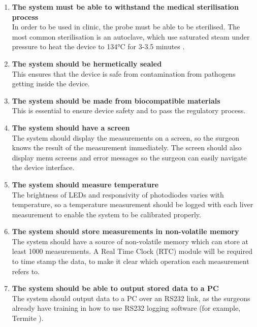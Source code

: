 \begin{enumerate}
\item \label{req: sterilise} \textbf{The system must be able to withstand the medical sterilisation process}\\
In order to be used in clinic, the probe must be able to be sterilised. The most common sterilisation is an autoclave, which use saturated steam under pressure to heat the device to 134\si{\celsius} for 3-3.5 minutes \cite{nhs_autoclave}.

\item \label{req: seal} \textbf{The system should be hermetically sealed}\\
This ensures that the device is safe from contamination from pathogens getting inside the device.

\item \label{req: biocompatible} \textbf{The system should be made from biocompatible materials}\\
This is essential to ensure device safety and to pass the regulatory process.




\item \label{req: screen} \textbf{The system should have a screen}\\
The system should display the measurements on a screen, so the surgeon knows the result of the measurement immediately. The screen should also display menu screens and error messages so the surgeon can easily navigate the device interface.

\item \label{req: temperature} \textbf{The system should measure temperature}\\
The brightness of LEDs and responsivity of photodiodes varies with temperature, so a temperature measurement should be logged with each liver measurement to enable the system to be calibrated properly.

\item \label{req: memory} \textbf{The system should store measurements in non-volatile memory}\\
The system should have a source of non-volatile memory which can store at least 1000 measurements. A Real Time Clock (RTC) module will be required to time stamp the data, to make it clear which operation each measurement refers to.

\item \label{req: rs232} \textbf{The system should be able to output stored data to a PC}\\
The system should output data to a PC over an RS232 link, as the surgeons already have training in how to use RS232 logging software (for example, Termite \cite{termite}).


\end{enumerate}